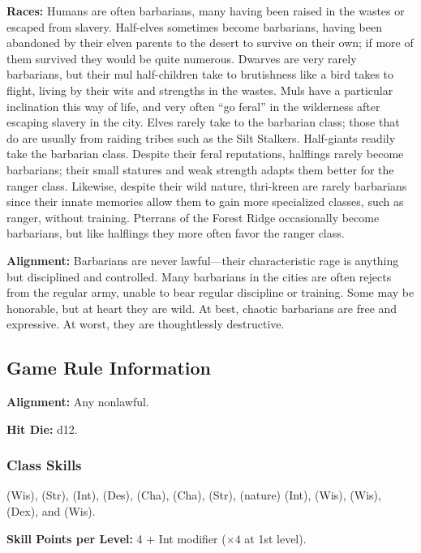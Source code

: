 \textbf{Races:} Humans are often barbarians, many having been raised in the wastes or escaped from slavery. Half-elves sometimes become barbarians, having been abandoned by their elven parents to the desert to survive on their own; if more of them survived they would be quite numerous. Dwarves are very rarely barbarians, but their mul half-children take to brutishness like a bird takes to flight, living by their wits and strengths in the wastes. Muls have a particular inclination this way of life, and very often ``go feral'' in the wilderness after escaping slavery in the city. Elves rarely take to the barbarian class; those that do are usually from raiding tribes such as the Silt Stalkers. Half-giants readily take the barbarian class. Despite their feral reputations, halflings rarely become barbarians; their small statures and weak strength adapts them better for the ranger class. Likewise, despite their wild nature, thri-kreen are rarely barbarians since their innate memories allow them to gain more specialized classes, such as ranger, without training. Pterrans of the Forest Ridge occasionally become barbarians, but like halflings they more often favor the ranger class.

\textbf{Alignment:} Barbarians are never lawful---their characteristic rage is anything but disciplined and controlled. Many barbarians in the cities are often rejects from the regular army, unable to bear regular discipline or training. Some may be honorable, but at heart they are wild. At best, chaotic barbarians are free and expressive. At worst, they are thoughtlessly destructive.

\subsection{Game Rule Information}
\textbf{Alignment:} Any nonlawful.

\textbf{Hit Die:} d12.

\subsubsection{Class Skills}
 (Wis),  (Str),  (Int),  (Des),  (Cha),  (Cha),  (Str),  (nature) (Int),  (Wis),  (Wis),  (Dex), and  (Wis).

\textbf{Skill Points per Level:} 4 + Int modifier ($\times4$ at 1st level).

